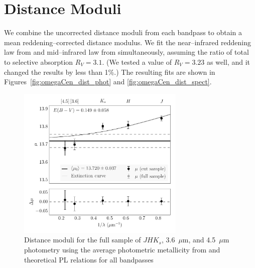 \documentclass[a4paper,fleqn,usenatbib]{mnras}
\begin{document}
\section{Distance Moduli}
\label{sec:distance_moduli}

We combine the uncorrected distance moduli from each bandpass to obtain a mean reddening--corrected distance modulus. We fit the near--infrared reddening law from \citet{1989ApJ...345..245C} and mid--infrared law from \citet{2005ApJ...619..931I} simultaneously, assuming the ratio of total to selective absorption $R_V = 3.1$. (We tested a value of $R_V = 3.23$ as well, and it changed the results by less than 1\%.) The resulting fits are shown in Figures~\ref{fig:omegaCen_dist_phot} and \ref{fig:omegaCen_dist_spect}.


\begin{figure}
\begin{center}
\includegraphics[width=80mm]{final_plots/multiwavelength_distance_fullandcut.pdf}
\caption{Distance moduli for the full sample of $J\!H\!K_s$, 3.6~$\mu$m, and 4.5~$\mu$m photometry using the average photometric metallicity from \citet{2000AJ....119.1824R} and theoretical PL relations for all bandpasses}
\label{fig:omegaCen_dist_phot_allstar}
\end{center}
\end{figure}
\end{document}
